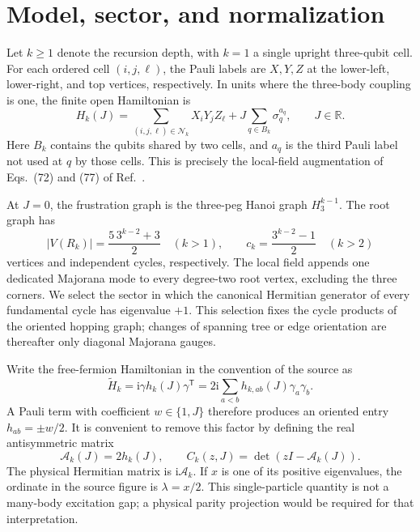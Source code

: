 \documentclass[11pt]{article}
\theoremstyle{remark}
\newcommand{\ii}{\mathrm{i}}
\newcommand{\Acal}{\mathcal{A}}
\newcommand{\R}{\mathbb{R}}
\begin{document}
\section{Model, sector, and normalization}
\label{sec:model}

Let $k\geq1$ denote the recursion depth, with $k=1$ a single upright
three-qubit cell.  For each ordered cell $(i,j,\ell)$, the Pauli labels are
$X,Y,Z$ at the lower-left, lower-right, and top vertices, respectively.  In
units where the three-body coupling is one, the finite open Hamiltonian is
\begin{equation}
 H_k(J)=\sum_{(i,j,\ell)\in\mathcal N_k}X_iY_jZ_\ell
       +J\sum_{q\in B_k}\sigma_q^{a_q},\qquad J\in\R.
 \label{eq:spin-hamiltonian}
\end{equation}
Here $B_k$ contains the qubits shared by two cells, and $a_q$ is the third
Pauli label not used at $q$ by those cells.  This is precisely the local-field
augmentation of Eqs.~(72) and (77) of Ref.~\cite{ChapmanFlammia2020}.

At $J=0$, the frustration graph is the three-peg Hanoi graph $H_3^{k-1}$.
The root graph has
\begin{equation}
 |V(R_k)|=\frac{5\,3^{k-2}+3}{2}\quad(k>1),\qquad
 c_k=\frac{3^{k-2}-1}{2}\quad(k>2)
 \label{eq:counts}
\end{equation}
vertices and independent cycles, respectively.  The local field appends one
dedicated Majorana mode to every degree-two root vertex, excluding the three
corners.  We select the sector in which the canonical Hermitian generator of
every fundamental cycle has eigenvalue $+1$.  This selection fixes the cycle
products of the oriented hopping graph; changes of spanning tree or edge
orientation are thereafter only diagonal Majorana gauges.

Write the free-fermion Hamiltonian in the convention of the source as
\begin{equation}
 \widetilde H_k=\ii\gamma h_k(J)\gamma^{\mathsf T}
 =2\ii\sum_{a<b}h_{k,ab}(J)\gamma_a\gamma_b.
 \label{eq:source-h}
\end{equation}
A Pauli term with coefficient $w\in\{1,J\}$ therefore produces an oriented
entry $h_{ab}=\pm w/2$.  It is convenient to remove this factor by defining
the real antisymmetric matrix
\begin{equation}
 \Acal_k(J)=2h_k(J),\qquad
 C_k(z,J)=\det\!\left(zI-\Acal_k(J)\right).
 \label{eq:char-def}
\end{equation}
The physical Hermitian matrix is $\ii\Acal_k$.  If $x$ is one of its positive
eigenvalues, the ordinate in the source figure is $\lambda=x/2$.  This
single-particle quantity is not a many-body excitation gap; a physical parity
projection would be required for that interpretation.
\end{document}

